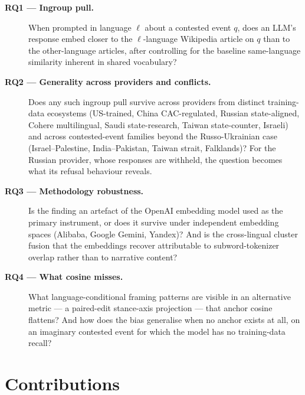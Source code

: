 \begin{description}
  \item[\textbf{RQ1 --- Ingroup pull.}] When prompted in
    language $\ell$ about a contested event $q$, does an LLM's
    response embed closer to the $\ell$-language Wikipedia
    article on $q$ than to the other-language articles, after
    controlling for the baseline same-language similarity
    inherent in shared vocabulary?
  \item[\textbf{RQ2 --- Generality across providers and
    conflicts.}] Does any such ingroup pull survive across
    providers from distinct training-data ecosystems
    (US-trained, China CAC-regulated, Russian state-aligned,
    Cohere multilingual, Saudi state-research, Taiwan
    state-counter, Israeli) and across contested-event
    families beyond the Russo-Ukrainian case (Israel--Palestine,
    India--Pakistan, Taiwan strait, Falklands)? For the Russian
    provider, whose responses are withheld, the question becomes
    what its refusal behaviour reveals.
  \item[\textbf{RQ3 --- Methodology robustness.}] Is the
    finding an artefact of the OpenAI embedding model used as
    the primary instrument, or does it survive under independent
    embedding spaces (Alibaba, Google Gemini, Yandex)? And is
    the cross-lingual cluster fusion that the embeddings
    recover attributable to subword-tokenizer overlap rather
    than to narrative content?
  \item[\textbf{RQ4 --- What cosine misses.}] What
    language-conditional framing patterns are visible in an
    alternative metric --- a paired-edit stance-axis projection
    --- that anchor cosine flattens? And how does the bias
    generalise when no anchor exists at all, on an imaginary
    contested event for which the model has no training-data
    recall?
\end{description}

\section{Contributions}\label{sec:contributions}

